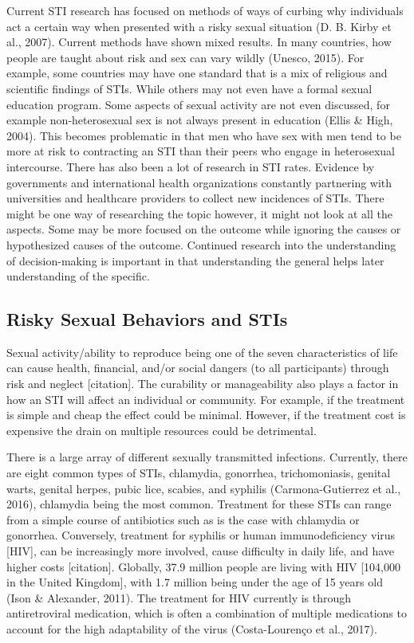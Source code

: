\documentclass[
  donotrepeattitle,doc, 12pt, a4paper,floatsintext]{apa7}
\begin{document}
Current STI research has focused on methods of ways of curbing why individuals act a certain way when presented with a risky sexual situation (D. B. Kirby et al., 2007). Current methods have shown mixed results. In many countries, how people are taught about risk and sex can vary wildly (Unesco, 2015). For example, some countries may have one standard that is a mix of religious and scientific findings of STIs. While others may not even have a formal sexual education program. Some aspects of sexual activity are not even discussed, for example non-heterosexual sex is not always present in education (Ellis \& High, 2004). This becomes problematic in that men who have sex with men tend to be more at risk to contracting an STI than their peers who engage in heterosexual intercourse. There has also been a lot of research in STI rates. Evidence by governments and international health organizations constantly partnering with universities and healthcare providers to collect new incidences of STIs. There might be one way of researching the topic however, it might not look at all the aspects. Some may be more focused on the outcome while ignoring the causes or hypothesized causes of the outcome. Continued research into the understanding of decision-making is important in that understanding the general helps later understanding of the specific.

\hypertarget{risky-sexual-behaviors-and-stis}{%
\subsection{Risky Sexual Behaviors and STIs}\label{risky-sexual-behaviors-and-stis}}

Sexual activity/ability to reproduce being one of the seven characteristics of life can cause health, financial, and/or social dangers (to all participants) through risk and neglect {[}citation{]}. The curability or manageability also plays a factor in how an STI will affect an individual or community. For example, if the treatment is simple and cheap the effect could be minimal. However, if the treatment cost is expensive the drain on multiple resources could be detrimental.

There is a large array of different sexually transmitted infections. Currently, there are eight common types of STIs, chlamydia, gonorrhea, trichomoniasis, genital warts, genital herpes, pubic lice, scabies, and syphilis (Carmona-Gutierrez et al., 2016), chlamydia being the most common. Treatment for these STIs can range from a simple course of antibiotics such as is the case with chlamydia or gonorrhea. Conversely, treatment for syphilis or human immunodeficiency virus {[}HIV{]}, can be increasingly more involved, cause difficulty in daily life, and have higher costs {[}citation{]}. Globally, 37.9 million people are living with HIV {[}104,000 in the United Kingdom{]}, with 1.7 million being under the age of 15 years old (Ison \& Alexander, 2011). The treatment for HIV currently is through antiretroviral medication, which is often a combination of multiple medications to account for the high adaptability of the virus (Costa-Lourenço et al., 2017).
\end{document}
